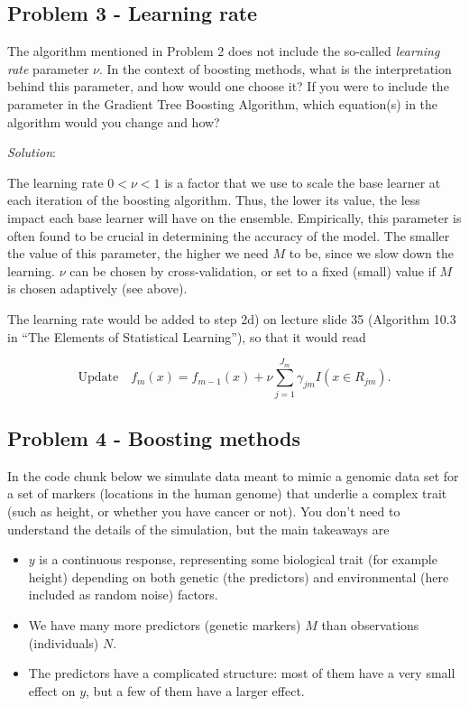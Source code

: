\documentclass[
]{article}
\providecommand{\tightlist}{%
  \setlength{\itemsep}{0pt}\setlength{\parskip}{0pt}}
\begin{document}
\subsection{Problem 3 - Learning rate}\label{problem-3---learning-rate}

The algorithm mentioned in Problem 2 does not include the so-called
\emph{learning rate} parameter \(\nu\). In the context of boosting
methods, what is the interpretation behind this parameter, and how would
one choose it? If you were to include the parameter in the Gradient Tree
Boosting Algorithm, which equation(s) in the algorithm would you change
and how?

\emph{Solution}:

The learning rate \(0<\nu<1\) is a factor that we use to scale the base
learner at each iteration of the boosting algorithm. Thus, the lower its
value, the less impact each base learner will have on the ensemble.
Empirically, this parameter is often found to be crucial in determining
the accuracy of the model. The smaller the value of this parameter, the
higher we need \(M\) to be, since we slow down the learning. \(\nu\) can
be chosen by cross-validation, or set to a fixed (small) value if \(M\)
is chosen adaptively (see above).

The learning rate would be added to step 2d) on lecture slide 35
(Algorithm 10.3 in ``The Elements of Statistical Learning''), so that it
would read

\[
\text{Update} \quad f_m(x)=f_{m-1}(x) + \nu \sum_{j=1}^{J_m} \gamma_{jm}I(x\in R_{jm}).
\]

\subsection{Problem 4 - Boosting
methods}\label{problem-4---boosting-methods}

In the code chunk below we simulate data meant to mimic a genomic data
set for a set of markers (locations in the human genome) that underlie a
complex trait (such as height, or whether you have cancer or not). You
don't need to understand the details of the simulation, but the main
takeaways are

\begin{itemize}
\tightlist
\item
  \(y\) is a continuous response, representing some biological trait
  (for example height) depending on both genetic (the predictors) and
  environmental (here included as random noise) factors.
\item
  We have many more predictors (genetic markers) \(M\) than observations
  (individuals) \(N\).
\item
  The predictors have a complicated structure: most of them have a very
  small effect on \(y\), but a few of them have a larger effect.
\end{itemize}
\end{document}

